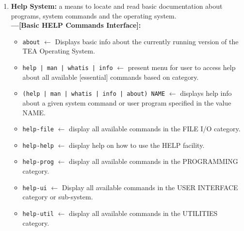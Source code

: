 \documentclass[a4paper, 18pt]{book} %
\begin{document}
{{{\begin{enumerate}
{\begin{itemize}
\item \texttt{username NAME} $\leftarrow$ Overrides current username with specified value.


\item \texttt{(whoami|name)} $\leftarrow$ Display the NAME of currently active USER.

\end{itemize}

}



\item {  \textbf{Help System:} a means to locate and read basic documentation about programs, system commands and the operating system.\\
\textbf{---[Basic HELP Commands Interface]:}
\begin{itemize}
\item \texttt{about} $\leftarrow$ Displays basic info about the currently running version of the TEA Operating System.
\item \texttt{help | man | whatis | info} $\leftarrow$ present menu for user to access help about all available [essential] commands based on category.
\item \texttt{(help | man | whatis | info | about) NAME} $\leftarrow$ displays help info about a given system command or user program specified in the value NAME.

\item \texttt{help-file} $\leftarrow$ display all available commands in the FILE I/O category.
\item \texttt{help-help} $\leftarrow$ display help on how to use the HELP facility.

\item \texttt{help-prog} $\leftarrow$ display all available commands in the PROGRAMMING category.

\item \texttt{help-ui} $\leftarrow$ Display all available commands in the USER INTERFACE category or sub-system.

\item \texttt{help-util} $\leftarrow$ display all available commands in the UTILITIES category.


\end{itemize}

}


\end{enumerate}


\vspace{2em}

}}}
\end{document}
